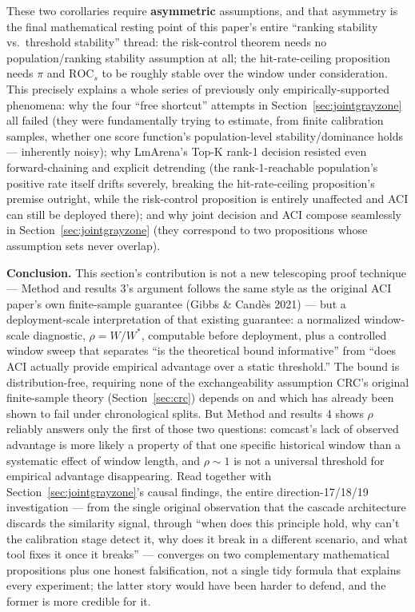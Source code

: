\documentclass[11pt]{article}
\begin{document}
These two corollaries require \textbf{asymmetric} assumptions, and that asymmetry is the final mathematical resting point of this paper's entire ``ranking stability vs.\ threshold stability'' thread: the risk-control theorem needs no population/ranking stability assumption at all; the hit-rate-ceiling proposition needs $\pi$ and $\text{ROC}_s$ to be roughly stable over the window under consideration. This precisely explains a whole series of previously only empirically-supported phenomena: why the four ``free shortcut'' attempts in Section~\ref{sec:jointgrayzone} all failed (they were fundamentally trying to estimate, from finite calibration samples, whether one score function's population-level stability/dominance holds --- inherently noisy); why LmArena's Top-K rank-1 decision resisted even forward-chaining and explicit detrending (the rank-1-reachable population's positive rate itself drifts severely, breaking the hit-rate-ceiling proposition's premise outright, while the risk-control proposition is entirely unaffected and ACI can still be deployed there); and why joint decision and ACI compose seamlessly in Section~\ref{sec:jointgrayzone} (they correspond to two propositions whose assumption sets never overlap).

\textbf{Conclusion.} This section's contribution is not a new telescoping proof technique --- Method and results 3's argument follows the same style as the original ACI paper's own finite-sample guarantee (Gibbs \& Cand\`es 2021) --- but a deployment-scale interpretation of that existing guarantee: a normalized window-scale diagnostic, $\rho = W/W^*$, computable before deployment, plus a controlled window sweep that separates ``is the theoretical bound informative'' from ``does ACI actually provide empirical advantage over a static threshold.'' The bound is distribution-free, requiring none of the exchangeability assumption CRC's original finite-sample theory (Section~\ref{sec:crc}) depends on and which has already been shown to fail under chronological splits. But Method and results 4 shows $\rho$ reliably answers only the first of those two questions: comcast's lack of observed advantage is more likely a property of that one specific historical window than a systematic effect of window length, and $\rho \sim 1$ is not a universal threshold for empirical advantage disappearing. Read together with Section~\ref{sec:jointgrayzone}'s causal findings, the entire direction-17/18/19 investigation --- from the single original observation that the cascade architecture discards the similarity signal, through ``when does this principle hold, why can't the calibration stage detect it, why does it break in a different scenario, and what tool fixes it once it breaks'' --- converges on two complementary mathematical propositions plus one honest falsification, not a single tidy formula that explains every experiment; the latter story would have been harder to defend, and the former is more credible for it.
\end{document}
